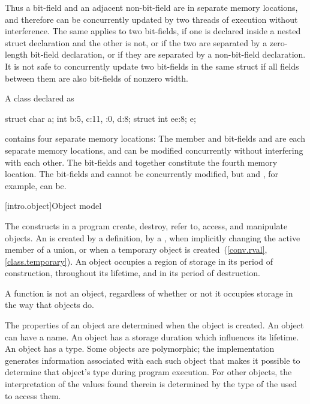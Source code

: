\pnum
\begin{note} Thus a bit-field and an adjacent non-bit-field are in separate memory
locations, and therefore can be concurrently updated by two threads of execution
without interference. The same applies to two bit-fields, if one is declared
inside a nested struct declaration and the other is not, or if the two are
separated by a zero-length bit-field declaration, or if they are separated by a
non-bit-field declaration. It is not safe to concurrently update two bit-fields
in the same struct if all fields between them are also bit-fields of nonzero
width. \end{note}

\pnum
\begin{example} A class declared as

\begin{codeblock}
struct {
  char a;
  int b:5,
  c:11,
  :0,
  d:8;
  struct {int ee:8;} e;
}
\end{codeblock}

contains four separate memory locations: The member  and bit-fields
 and  are each separate memory locations, and can be
modified concurrently without interfering with each other. The bit-fields
 and  together constitute the fourth memory location. The
bit-fields  and  cannot be concurrently modified, but
 and , for example, can be. \end{example}%

[intro.object]{Object model}

\pnum
{}%
The constructs in a \Cpp{} program create, destroy, refer to, access, and
manipulate objects.
An  is created
by a definition,
by a ,
when implicitly changing the active member of a union,
or
when a temporary object is created~(\ref{conv.rval}, \ref{class.temporary}).
An object occupies a region of storage
in its period of construction,
throughout its lifetime,
and
in its period of destruction.
\begin{note} A function is not an object, regardless of whether or not it
occupies storage in the way that objects do. \end{note}
The properties of an
object are determined when the object is created. An object can have a
name. An object has a storage
duration which influences its
lifetime. An object has a
type.
Some objects are
polymorphic; the implementation
generates information associated with each such object that makes it
possible to determine that object's type during program execution. For
other objects, the interpretation of the values found therein is
determined by the type of the 
used to access them.

